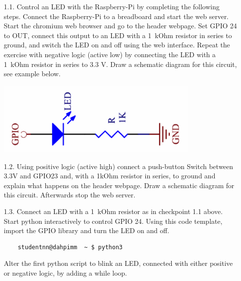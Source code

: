 \begin{enumerate}
\item [1.1.] Control an LED with the Raspberry-Pi by completing the following steps. Connect the Raspberry-Pi to a breadboard and start the \webIOPi web server.
Start the chromium web browser %
and go to the \webIOPi header webpage.
Set GPIO 24 to OUT, connect this output to an LED with a 1~kOhm resistor in series to ground, and switch the LED on and off using the web interface.
Repeat the exercise with negative logic (active low) by connecting the LED with a 1~kOhm resistor in series to 3.3 V.
Draw a schematic diagram for this circuit, see example below.  

\vspace*{-3mm}
\begin{center}                                        
{\includegraphics[width=10cm]{figs/ActiveHighLED}}
\end{center}
                                                            
 
\item [1.2.] Using positive logic (active high) connect a push-button Switch between 3.3V and GPIO23 and, with a 1kOhm resistor in series, to ground and explain what happens on the \webIOPi header webpage.
Draw a schematic diagram for this circuit. Afterwards stop the \webIOPi web server.
 
      

\item [1.3.] Connect an LED with a 1~kOhm resistor as in checkpoint 1.1 above. Start python interactively to control GPIO 24.
Using this code template, import the GPIO library and turn the LED on and off.
%
\begin{verbatim}
    studentnn@dahpimm  ~ $ python3
\end{verbatim}



Alter the first python script to blink an LED, connected with either positive or negative logic,
by adding a while loop.\\


\end{enumerate}
